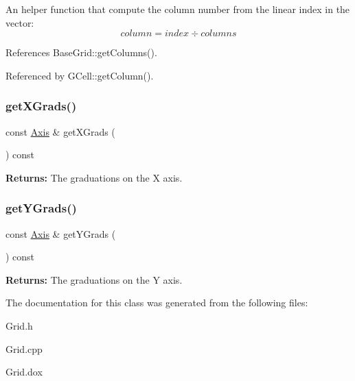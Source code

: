 An helper function that compute the column number from the linear index in the vector\+: \[ column = index \div columns \] 

References Base\+Grid\+::get\+Columns().



Referenced by G\+Cell\+::get\+Column().

\mbox{\label{classKatabatic_1_1BaseGrid_a1e3eea49f6f58fb8d0b3fa73f5cf3fd7}} 
\subsubsection{\texorpdfstring{get\+X\+Grads()}{getXGrads()}}
{\footnotesize\ttfamily const \mbox{\hyperlink{classKatabatic_1_1BaseGrid_1_1Axis}{Axis}} \& get\+X\+Grads (\begin{DoxyParamCaption}{ }\end{DoxyParamCaption}) const\hspace{0.3cm}{\ttfamily [inline]}}

{\bfseries Returns\+:} The graduations on the X axis. \mbox{\label{classKatabatic_1_1BaseGrid_ab11d8b83eaa19f5fe6fecc63a8bb203e}} 
\subsubsection{\texorpdfstring{get\+Y\+Grads()}{getYGrads()}}
{\footnotesize\ttfamily const \mbox{\hyperlink{classKatabatic_1_1BaseGrid_1_1Axis}{Axis}} \& get\+Y\+Grads (\begin{DoxyParamCaption}{ }\end{DoxyParamCaption}) const\hspace{0.3cm}{\ttfamily [inline]}}

{\bfseries Returns\+:} The graduations on the Y axis. 

The documentation for this class was generated from the following files\+:\begin{DoxyCompactItemize}
\item 
Grid.\+h\item 
Grid.\+cpp\item 
Grid.\+dox\end{DoxyCompactItemize}
